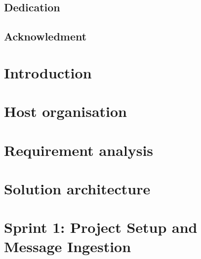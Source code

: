 \setlength {\marginparwidth }{2cm}


    
    \setcounter{page}{1} 

    \section*{Dedication}
    
    \pagebreak

    \section*{Acknowledment}
    
    \pagebreak

    \tableofcontents
    \pagebreak

    \listoffigures
    \pagebreak
    \listoftables
    \pagebreak
    \lstlistoflistings


    \justify

    \setcounter{page}{1} 
    \newpage
    \setcounter{page}{1} 

    \chapter*{Introduction}
    

    \pagebreak

    \chapter{Host organisation}
    

    \chapter{Requirement analysis}
    

    \chapter{Solution architecture}
    

    \chapter{Sprint 1: Project Setup and Message Ingestion}
    

